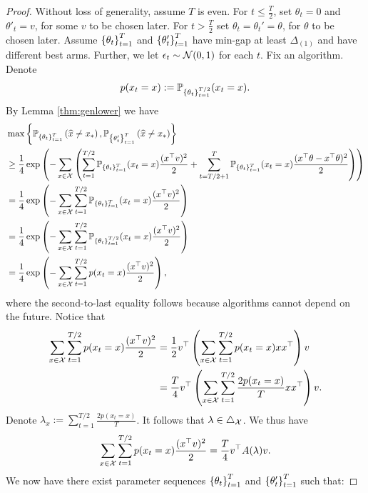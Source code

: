 \begin{proof}
    Without loss of generality, assume $T$ is even. For $t \leq \frac{T}{2}$, set $\theta_t = 0$ and $\theta'_t = v$, for some $v$ to be chosen later. For $t>\frac{T}{2}$ set $\theta_t =\theta_t' = \theta$, for $\theta$ to be chosen later. Assume $\Bp{\theta_t}_{t=1}^{T}$ and $\Bp{\theta'_t}_{t=1}^{T}$ have min-gap at least $\Delta_{(1)}$ and have different best arms. Further, we let $\epsilon_t \sim \mc{N}(0,1)$ for each $t$. Fix an algorithm. Denote \begin{equation}p(x_t = x) := \P_{\{\theta_t\}_{t=1}^{T/2}}(x_t=x).\end{equation} By Lemma \ref{thm:genlower} we have
    \begin{align*}&\max\Bp{\P_{\Bp{\theta_t}_{t=1}^{T}}\Sp{\widehat{x}\neq x_*}, \P_{\Bp{\theta'_t}_{t=1}^{T}}\Sp{\widehat{x}\neq x_*}}\\ 
    &\geq \frac{1}{4} \exp \left(-\sum_{x \in \X}\left(\sum_{t=1}^{T/2}\P_{\{\theta_t\}_{t=1}^{T}}(x_t=x)\frac{(x^\top v)^2}{2}  + \sum_{t=T/2 + 1}^{T}\P_{\{\theta_t\}_{t=1}^{T}}(x_t=x)  \frac{(x^\top \theta - x^\top \theta)^2}{2}\right)\right) \\
         &= \frac{1}{4} \exp \left(- \sum_{x \in \X} \sum_{t=1}^{T/2}\P_{\{\theta_t\}_{t=1}^{T}}(x_t=x)\frac{(x^\top v)^2}{2}\right) \\
         &= \frac{1}{4} \exp \left(- \sum_{x \in \X} \sum_{t=1}^{T/2}\P_{\{\theta_t\}_{t=1}^{T/2}}(x_t=x)\frac{(x^\top v)^2}{2}\right) \\
        &= \frac{1}{4} \exp \left(- \sum_{x \in \X}  \sum_{t=1}^{T/2}p(x_t = x)\frac{(x^\top v)^2}{2}\right),
    \end{align*}
where the second-to-last equality follows because algorithms cannot depend on the future. Notice that \begin{align*}
\sum_{x \in \X}  \sum_{t=1}^{T/2}p(x_t = x)\frac{(x^\top v)^2}{2}
    &=\frac{1}{2}v^\top\left(\sum_{x \in \X}  \sum_{t=1}^{T/2}p(x_t = x)xx^\top\right) v \\
    &= \frac{T}{4}v^\top\left(\sum_{x \in \X}\sum_{t=1}^{T/2}  \frac{2p(x_t = x)}{T}xx^\top\right) v.
\end{align*}
Denote $\lambda_x:=\sum_{t=1}^{T/2}\frac{2 p(x_t = x) }{T}$. It follows that $\lambda \in \triangle_{\X}$. We thus have \begin{equation}\sum_{x \in \X}\sum_{t=1}^{T/2}  p(x_t = x)\frac{(x^\top v)^2}{2} = \frac{T}{4}v^\top A(\lambda)v.\end{equation} We now have there exist parameter sequences $\Bp{\theta_t}_{t=1}^{T}$ and $\Bp{\theta'_t}_{t=1}^{T}$ such that: 

\end{proof}
